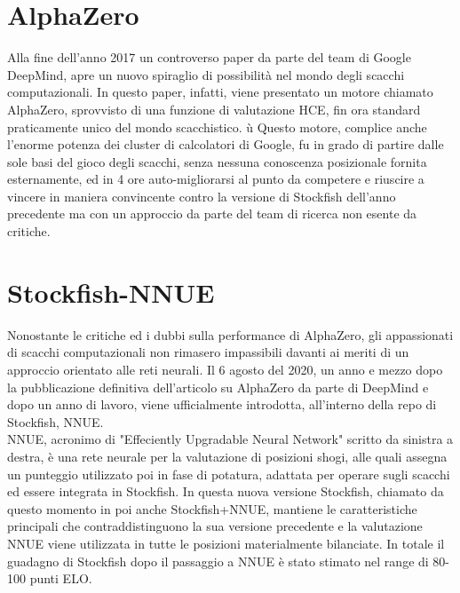 \section{AlphaZero}
Alla fine dell'anno 2017 un controverso paper\cite{DBLP:journals/corr/abs-1712-01815} da parte del team di Google DeepMind, apre un nuovo spiraglio di possibilità nel mondo degli scacchi computazionali. In questo paper, infatti, viene presentato un motore chiamato AlphaZero, sprovvisto di una funzione di valutazione HCE, fin ora standard praticamente unico del mondo scacchistico. ù
Questo motore, complice anche l'enorme 
potenza dei cluster di calcolatori di Google, fu in grado di partire dalle sole basi del gioco degli scacchi, senza nessuna conoscenza posizionale fornita esternamente, ed in 4 ore auto-migliorarsi al punto 
da competere e riuscire a vincere in maniera convincente contro la versione di Stockfish dell'anno precedente ma con un approccio da parte del team di ricerca non esente da critiche\cite{chess.com}.



\section{Stockfish-NNUE}
Nonostante le critiche ed i dubbi sulla performance di AlphaZero, gli appassionati di scacchi computazionali non rimasero impassibili davanti ai meriti di un approccio orientato alle reti neurali.
Il 6 agosto del 2020, un anno e mezzo dopo la pubblicazione definitiva dell'articolo su AlphaZero da parte di DeepMind e dopo un anno di lavoro, viene ufficialmente introdotta, all'interno della repo di Stockfish, NNUE.
\\NNUE, acronimo di "Effeciently Upgradable Neural Network" scritto da sinistra a destra, è una rete neurale per la valutazione di posizioni shogi, alle quali assegna un punteggio
utilizzato poi in fase di potatura, adattata per operare sugli scacchi ed essere integrata in Stockfish.
In questa nuova versione Stockfish, chiamato da questo momento in poi anche Stockfish+NNUE, mantiene le caratteristiche principali che contraddistinguono la sua versione precedente e la valutazione NNUE viene
utilizzata in tutte le posizioni materialmente bilanciate. In totale il guadagno di Stockfish dopo il passaggio a NNUE è stato stimato nel range di 80-100 punti ELO.

